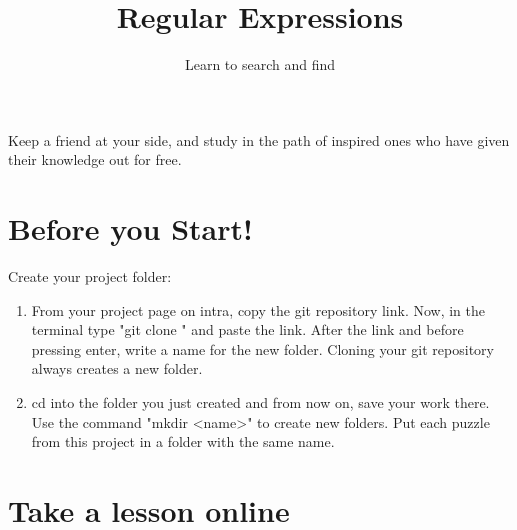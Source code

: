 \documentclass{42-en}
\begin{document}
\title{Regular Expressions}
\subtitle{Learn to search and find}


\summary
{
	Keep a friend at your side, and study in the path of inspired ones who have given their knowledge out for free. 
}

\maketitle

\tableofcontents


\chapter{Before you Start!}

Create your project folder:
	\begin{enumerate}
		\item From your project page on intra, copy the git repository link. Now, in the terminal type "git clone " and paste the link. After the link and before pressing enter, write a name for the new folder. Cloning your git repository always creates a new folder.
		\item cd into the folder you just created and from now on, save your work there. Use the command "mkdir <name>" to create new folders. Put each puzzle from this project in a folder with the same name.
	\end{enumerate}


\chapter{Take a lesson online}
\end{document}
